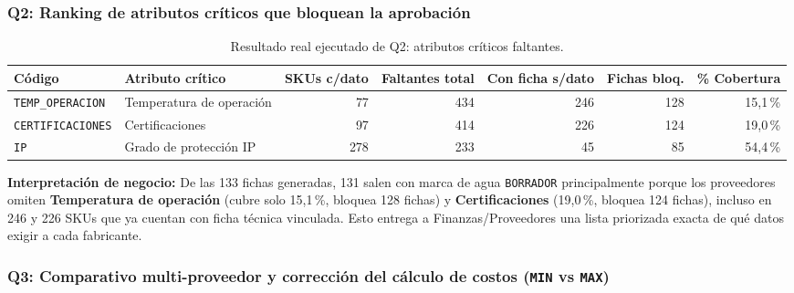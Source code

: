 \documentclass{article}
\begin{document}
\subsubsection*{Q2: Ranking de atributos críticos que bloquean la aprobación}

\begin{table}[H]
\centering
\scriptsize
\begin{tabularx}{\textwidth}{lLrrrrr}
\toprule
\textbf{Código} & \textbf{Atributo crítico} & \textbf{SKUs c/dato} & \textbf{Faltantes total} & \textbf{Con ficha s/dato} & \textbf{Fichas bloq.} & \textbf{\% Cobertura} \\
\midrule
\texttt{TEMP\_OPERACION} & Temperatura de operación & 77 & 434 & 246 & 128 & 15,1\,\% \\
\texttt{CERTIFICACIONES} & Certificaciones & 97 & 414 & 226 & 124 & 19,0\,\% \\
\texttt{IP} & Grado de protección IP & 278 & 233 & 45 & 85 & 54,4\,\% \\
\bottomrule
\end{tabularx}
\caption{Resultado real ejecutado de Q2: atributos críticos faltantes.}
\end{table}

\textbf{Interpretación de negocio:} De las 133 fichas generadas, 131 salen con marca de agua \texttt{BORRADOR} principalmente porque los proveedores omiten \textbf{Temperatura de operación} (cubre solo 15,1\,\%, bloquea 128 fichas) y \textbf{Certificaciones} (19,0\,\%, bloquea 124 fichas), incluso en 246 y 226 SKUs que ya cuentan con ficha técnica vinculada. Esto entrega a Finanzas/Proveedores una lista priorizada exacta de qué datos exigir a cada fabricante.

\subsubsection*{Q3: Comparativo multi-proveedor y corrección del cálculo de costos (\texttt{MIN} vs \texttt{MAX})}
\end{document}
